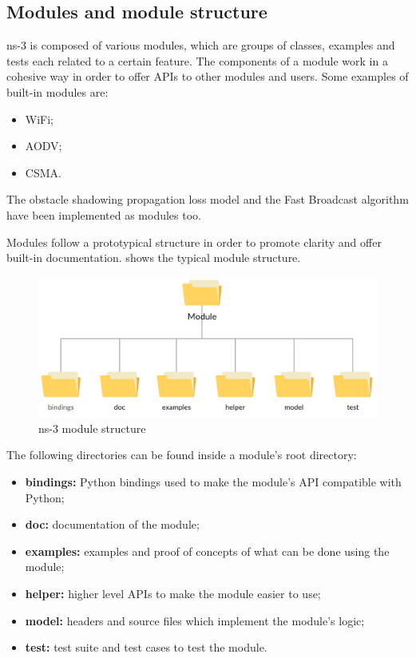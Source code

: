 		\subsection{Modules and module structure}
			ns-3 is composed of various modules, which are groups of classes, examples and tests each related to a certain feature. The components of a module work in a cohesive way in order to offer APIs to other modules and users. Some examples of built-in modules are:
			\begin{itemize}
				\item WiFi;
				\item AODV; 
				\item CSMA.
			\end{itemize}
			The obstacle shadowing propagation loss model and the Fast Broadcast algorithm have been implemented as modules too.
			
			
			Modules follow a prototypical structure in order to promote clarity and offer built-in documentation.  shows the typical module structure.
			
			\begin{figure}[H]
				\centering
				\includegraphics[width=\textwidth]{immagini/ns-3-module}
				\caption{ns-3 module structure}
				\label{fig:ns-3-module}
			\end{figure}
		
			The following directories can be found inside a module's root directory:
			\begin{itemize}
				\item \textbf{bindings:} Python bindings used to make the module's API compatible with Python;
				\item \textbf{doc:} documentation of the module;
				\item \textbf{examples:} examples and proof of concepts of what can be done using the module;
				\item \textbf{helper:} higher level APIs to make the module easier to use;
				\item \textbf{model:} headers and source files which implement the module's logic; 
				\item \textbf{test:} test suite and test cases to test the module.
			\end{itemize}
		

